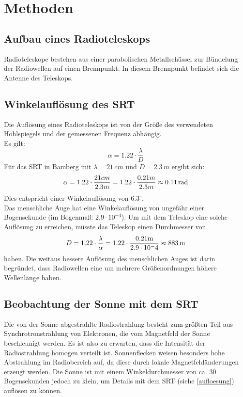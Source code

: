 \section{Methoden}
\subsection{Aufbau eines Radioteleskops}
Radioteleskope bestehen aus einer parabolischen Metallschüssel zur Bündelung der Radiowellen auf einen Brennpunkt. In diesem Brennpunkt befindet sich die Antenne des Teleskops. 
\subsection{Winkelauflösung des SRT}
Die Auflösung eines Radioteleskops ist von der Größe des verwendeten Hohlspiegels und der gemessenen Frequenz abhängig.\\
Es gilt:
\begin{equation}
\alpha = 1.22\cdot\frac{\lambda}{D}
\end{equation}
Für das SRT in Bamberg mit $\lambda=21\,cm$ und $D=2.3\, m$ ergibt sich:
\begin{equation}
\alpha = 1.22\cdot\frac{21 cm}{2.3 m} = 1.22\cdot\frac{0.21 m}{2.3 m} \approx 0.11\,\mathrm{rad} 
\label{aufloesung}
\end{equation}
Dies entspricht einer Winkelauflösung von $6.3^\circ$.
\\
Das menschliche Auge hat eine Winkelauflösung von ungefähr einer Bogensekunde (im Bogenmaß: $2.9\cdot10^{-4}$). Um mit dem Teleskop eine solche Auflösung zu erreichen, müsste das Teleskop einen Durchmesser von
\begin{equation}
D = 1.22\cdot\frac{\lambda}{\alpha} = 1.22\cdot\frac{0.21 \mathrm{m}}{2.9\cdot10^-4} \approx 883\,\mathrm{m}
\end{equation}
haben. Die weitaus bessere Auflösung des menschlichen Auges ist darin begründet, dass Radiowellen eine um mehrere Größenordnungen höhere Wellenlänge haben.
\subsection{Beobachtung der Sonne mit dem SRT}
Die von der Sonne abgestrahlte Radiostrahlung besteht zum größten Teil aus Synchrotronstrahlung von Elektronen, die vom Magnetfeld der Sonne beschleunigt werden. Es ist also zu erwarten, dass die Intensität der Radiostrahlung homogen verteilt ist. Sonnenflecken weisen besonders hohe Abstrahlung im Radiobereich auf, da diese durch lokale Magnetfeldänderungen erzeugt werden. Die Sonne ist mit einem Winkeldurchmesser von ca. 30 Bogensekunden jedoch zu klein, um Details mit dem SRT (siehe \eqref{aufloesung}) auflösen zu können.\\

